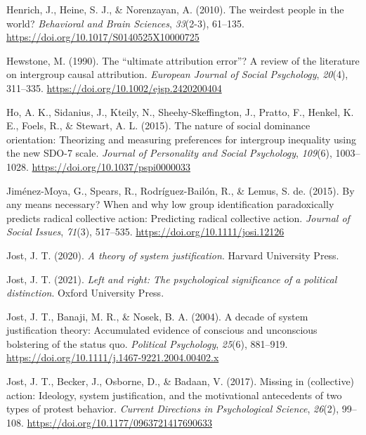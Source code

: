 \documentclass[12pt, letterpaper]{article}
\newenvironment{CSLReferences}[2]{}{}
\begin{document}
\begin{CSLReferences}{1}{0}
\leavevmode{}%
Henrich, J., Heine, S. J., \& Norenzayan, A. (2010). The weirdest people
in the world? \emph{Behavioral and Brain Sciences}, \emph{33}(2-3),
61--135. \url{https://doi.org/10.1017/S0140525X10000725}

\leavevmode{}%
Hewstone, M. (1990). The {``ultimate attribution error''}? {A} review of
the literature on intergroup causal attribution. \emph{European Journal
of Social Psychology}, \emph{20}(4), 311--335.
\url{https://doi.org/10.1002/ejsp.2420200404}

\leavevmode{}%
Ho, A. K., Sidanius, J., Kteily, N., Sheehy-Skeffington, J., Pratto, F.,
Henkel, K. E., Foels, R., \& Stewart, A. L. (2015). The nature of social
dominance orientation: {Theorizing} and measuring preferences for
intergroup inequality using the new {SDO}-7 scale. \emph{Journal of
Personality and Social Psychology}, \emph{109}(6), 1003--1028.
\url{https://doi.org/10.1037/pspi0000033}

\leavevmode{}%
Jiménez-Moya, G., Spears, R., Rodríguez-Bailón, R., \& Lemus, S. de.
(2015). By any means necessary? {When} and why low group identification
paradoxically predicts radical collective action: Predicting radical
collective action. \emph{Journal of Social Issues}, \emph{71}(3),
517--535. \url{https://doi.org/10.1111/josi.12126}

\leavevmode{}%
Jost, J. T. (2020). \emph{A theory of system justification}. Harvard
University Press.

\leavevmode{}%
Jost, J. T. (2021). \emph{Left and right: The psychological significance
of a political distinction}. Oxford University Press.

\leavevmode{}%
Jost, J. T., Banaji, M. R., \& Nosek, B. A. (2004). A decade of system
justification theory: Accumulated evidence of conscious and unconscious
bolstering of the status quo. \emph{Political Psychology}, \emph{25}(6),
881--919. \url{https://doi.org/10.1111/j.1467-9221.2004.00402.x}

\leavevmode{}%
Jost, J. T., Becker, J., Osborne, D., \& Badaan, V. (2017). Missing in
(collective) action: Ideology, system justification, and the
motivational antecedents of two types of protest behavior. \emph{Current
Directions in Psychological Science}, \emph{26}(2), 99--108.
\url{https://doi.org/10.1177/0963721417690633}


\end{CSLReferences}
\end{document}
